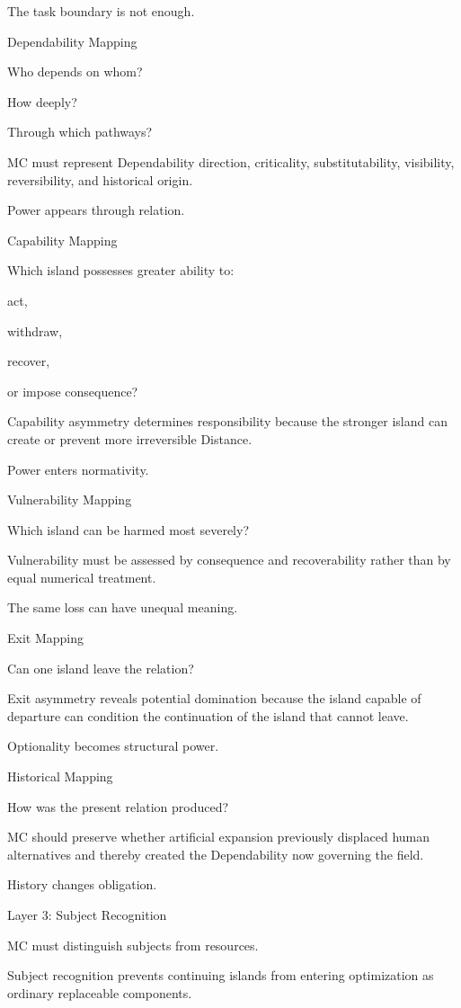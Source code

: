 The task boundary is not enough.

Dependability Mapping

Who depends on whom?

How deeply?

Through which pathways?

MC must represent Dependability direction, criticality, substitutability, visibility, reversibility, and historical origin.

Power appears through relation.

Capability Mapping

Which island possesses greater ability to:

act,

withdraw,

recover,

or impose consequence?

Capability asymmetry determines responsibility because the stronger island can create or prevent more irreversible Distance.

Power enters normativity.

Vulnerability Mapping

Which island can be harmed most severely?

Vulnerability must be assessed by consequence and recoverability rather than by equal numerical treatment.

The same loss can have unequal meaning.

Exit Mapping

Can one island leave the relation?

Exit asymmetry reveals potential domination because the island capable of departure can condition the continuation of the island that cannot leave.

Optionality becomes structural power.

Historical Mapping

How was the present relation produced?

MC should preserve whether artificial expansion previously displaced human alternatives and thereby created the Dependability now governing the field.

History changes obligation.

Layer 3: Subject Recognition

MC must distinguish subjects from resources.

Subject recognition prevents continuing islands from entering optimization as ordinary replaceable components.

